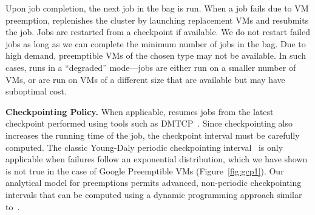 Upon job completion, the next job in the bag is run. 
When a job fails due to VM preemption, \sysname replenishes the cluster by launching replacement VMs and resubmits the job. 
Jobs are restarted from a checkpoint if available. 
We do not restart failed jobs as long as we can complete the minimum number of jobs in the bag.
Due to high demand, preemptible VMs of the chosen type may not be available.
In such cases, \sysname runs in a ``degraded'' mode---jobs are either run on a smaller number of VMs, or are run on VMs of a different size that are available but may have suboptimal cost.  


\noindent \textbf{Checkpointing Policy.} When applicable, \sysname resumes jobs from the latest checkpoint performed using tools such as DMTCP~\cite{ansel2009dmtcp}.
Since checkpointing also increases the running time of the job, the checkpoint interval must be carefully computed. 
The classic Young-Daly periodic checkpointing interval~\cite{daly2006higher} is only applicable when failures follow an exponential distribution, which we have shown is not true in the case of Google Preemptible VMs (Figure~\ref{fig:gcp1}). 
Our analytical model for preemptions permits advanced, non-periodic checkpointing intervals that can be computed using a dynamic programming approach similar to~\cite{bougeret_checkpointing_2011}. 

